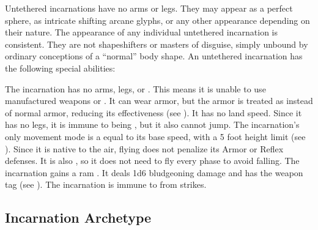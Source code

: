   Untethered incarnations have no arms or legs.
  They may appear as a perfect sphere, as intricate shifting arcane glyphs, or any other appearance depending on their nature.
  The appearance of any individual untethered incarnation is consistent.
  They are not shapeshifters or masters of disguise, simply unbound by ordinary conceptions of a ``normal'' body shape.
  An untethered incarnation has the following special abilities:
  \begin{raggeditemize}
     The incarnation has no arms, legs, or .
      This means it is unable to use manufactured weapons or .
      It can wear armor, but the armor is treated as  instead of normal armor, reducing its effectiveness (see ).
      It has no land speed.
      Since it has no legs, it is immune to being \prone, but it also cannot jump.
       The incarnation's only movement mode is a  equal to its base speed, with a 5 foot height limit (see ).
      Since it is native to the air, flying does not penalize its Armor or Reflex defenses.
      It is also , so it does not need to fly every phase to avoid falling.
     The incarnation gains a ram .
      It deals 1d6 bludgeoning damage and has the  weapon tag (see ).
     The incarnation is immune to  from strikes.
  \end{raggeditemize}

  \subsection{Incarnation Archetype}

